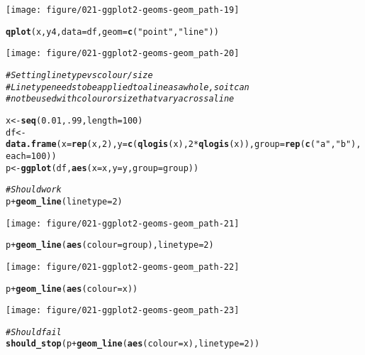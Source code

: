 \documentclass[a4paper,titlepage]{tufte-handout}\usepackage[]{graphicx}\usepackage[]{color}
\makeatletter
\def\maxwidth{ %
  \ifdim\Gin@nat@width>\linewidth
    \linewidth
  \else
    \Gin@nat@width
  \fi
}
\newcommand{\hlnum}[1]{\textcolor[rgb]{0.686,0.059,0.569}{#1}}%
\newcommand{\hlstr}[1]{\textcolor[rgb]{0.192,0.494,0.8}{#1}}%
\newcommand{\hlcom}[1]{\textcolor[rgb]{0.678,0.584,0.686}{\textit{#1}}}%
\newcommand{\hlopt}[1]{\textcolor[rgb]{0,0,0}{#1}}%
\newcommand{\hlstd}[1]{\textcolor[rgb]{0.345,0.345,0.345}{#1}}%
\newcommand{\hlkwb}[1]{\textcolor[rgb]{0.69,0.353,0.396}{#1}}%
\newcommand{\hlkwc}[1]{\textcolor[rgb]{0.333,0.667,0.333}{#1}}%
\newcommand{\hlkwd}[1]{\textcolor[rgb]{0.737,0.353,0.396}{\textbf{#1}}}%
\newenvironment{kframe}{%
 \def\at@end@of@kframe{}%
 \ifinner\ifhmode%
  \def\at@end@of@kframe{\end{minipage}}%
  \begin{minipage}{\columnwidth}%
 \fi\fi%
 \def\FrameCommand##1{\hskip\@totalleftmargin \hskip-\fboxsep
 \colorbox{shadecolor}{##1}\hskip-\fboxsep
     \hskip-\linewidth \hskip-\@totalleftmargin \hskip\columnwidth}%
 \MakeFramed {\advance\hsize-\width
   \@totalleftmargin\z@ \linewidth\hsize
   \@setminipage}}%
 {\par\unskip\endMakeFramed%
 \at@end@of@kframe}
\newenvironment{knitrout}{}{} %
\makeatother
\begin{document}
\begin{knitrout}
\begin{kframe}
{\ttfamily\noindent\color{warningcolor}{\#\# Warning in loop\_apply(n, do.ply): Removed 1 rows containing missing values (geom\_point).}}\end{kframe}
\texttt{[image: figure/021-ggplot2-geoms-geom\_path-19]} 
\begin{kframe}\begin{alltt}
\hlkwd{qplot}\hlstd{(x, y4,} \hlkwc{data} \hlstd{= df,} \hlkwc{geom} \hlstd{=} \hlkwd{c}\hlstd{(}\hlstr{"point"}\hlstd{,}\hlstr{"line"}\hlstd{))}
\end{alltt}
\end{kframe}
\texttt{[image: figure/021-ggplot2-geoms-geom\_path-20]} 
\begin{kframe}\begin{alltt}
\hlcom{# Setting line type vs colour/size}
\hlcom{# Line type needs to be applied to a line as a whole, so it can}
\hlcom{# not be used with colour or size that vary across a line}

\hlstd{x} \hlkwb{<-} \hlkwd{seq}\hlstd{(}\hlnum{0.01}\hlstd{,} \hlnum{.99}\hlstd{,} \hlkwc{length}\hlstd{=}\hlnum{100}\hlstd{)}
\hlstd{df} \hlkwb{<-} \hlkwd{data.frame}\hlstd{(}\hlkwc{x} \hlstd{=} \hlkwd{rep}\hlstd{(x,} \hlnum{2}\hlstd{),} \hlkwc{y} \hlstd{=} \hlkwd{c}\hlstd{(}\hlkwd{qlogis}\hlstd{(x),} \hlnum{2} \hlopt{*} \hlkwd{qlogis}\hlstd{(x)),} \hlkwc{group} \hlstd{=} \hlkwd{rep}\hlstd{(}\hlkwd{c}\hlstd{(}\hlstr{"a"}\hlstd{,}\hlstr{"b"}\hlstd{),} \hlkwc{each}\hlstd{=}\hlnum{100}\hlstd{))}
\hlstd{p} \hlkwb{<-} \hlkwd{ggplot}\hlstd{(df,} \hlkwd{aes}\hlstd{(}\hlkwc{x}\hlstd{=x,} \hlkwc{y}\hlstd{=y,} \hlkwc{group}\hlstd{=group))}

\hlcom{# Should work}
\hlstd{p} \hlopt{+} \hlkwd{geom_line}\hlstd{(}\hlkwc{linetype} \hlstd{=} \hlnum{2}\hlstd{)}
\end{alltt}
\end{kframe}
\texttt{[image: figure/021-ggplot2-geoms-geom\_path-21]} 
\begin{kframe}\begin{alltt}
\hlstd{p} \hlopt{+} \hlkwd{geom_line}\hlstd{(}\hlkwd{aes}\hlstd{(}\hlkwc{colour} \hlstd{= group),} \hlkwc{linetype} \hlstd{=} \hlnum{2}\hlstd{)}
\end{alltt}
\end{kframe}
\texttt{[image: figure/021-ggplot2-geoms-geom\_path-22]} 
\begin{kframe}\begin{alltt}
\hlstd{p} \hlopt{+} \hlkwd{geom_line}\hlstd{(}\hlkwd{aes}\hlstd{(}\hlkwc{colour} \hlstd{= x))}
\end{alltt}
\end{kframe}
\texttt{[image: figure/021-ggplot2-geoms-geom\_path-23]} 
\begin{kframe}\begin{alltt}
\hlcom{# Should fail}
\hlkwd{should_stop}\hlstd{(p} \hlopt{+} \hlkwd{geom_line}\hlstd{(}\hlkwd{aes}\hlstd{(}\hlkwc{colour} \hlstd{= x),} \hlkwc{linetype}\hlstd{=}\hlnum{2}\hlstd{))}


\end{alltt}
\end{kframe}
\end{knitrout}
\end{document}
